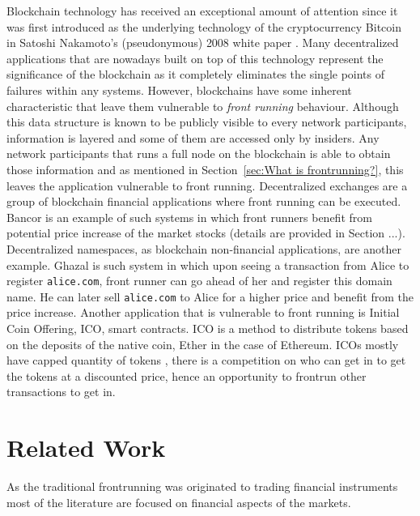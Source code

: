 Blockchain technology has received an exceptional amount of attention since it was first introduced as the underlying technology of the cryptocurrency Bitcoin in Satoshi Nakamoto's (pseudonymous) 2008 white paper \cite{nakamoto2008bitcoin}. Many decentralized applications that are nowadays built on top of this technology represent the significance of the blockchain as it completely eliminates the single points of failures within any systems. However, blockchains have some inherent characteristic that leave them vulnerable to \emph{front running} behaviour. Although this data structure is known to be publicly visible to every network participants, information is layered  and some of them are accessed only by insiders. Any network participants that runs a full node on the blockchain is able to obtain those information and as mentioned in Section~\ref{sec:What is frontrunning?}, this leaves the application vulnerable to front running. Decentralized exchanges are a group of blockchain financial applications where front running can be executed. Bancor \cite{hertzog2017bancor} is an example of such systems in which front runners benefit from potential price increase of the market stocks (details are provided in Section ...). Decentralized namespaces, as blockchain non-financial applications, are another example. Ghazal \cite{moosavighazal} is such system in which upon seeing a transaction from Alice to register \texttt{alice.com}, front runner can go ahead of her and register this domain name. He can later sell \texttt{alice.com} to Alice for a higher price and benefit from the price increase.
Another application that is vulnerable to front running is Initial Coin Offering, ICO, smart contracts. ICO is a method to distribute tokens based on the deposits of the native coin, Ether in the case of Ethereum. ICOs mostly have capped quantity of tokens , there is a competition on who can get in to get the tokens at a discounted price, hence an opportunity to frontrun other transactions to get in. 



\section{Related Work}
As the traditional frontrunning was originated to trading financial instruments most of the literature are focused on financial aspects of the markets. %



